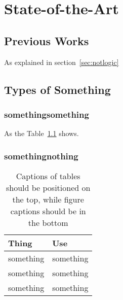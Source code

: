 \chapter{State-of-the-Art}
\label{ch:stateart}




\section{Previous Works}
\label{sec:prevworks}
	
As explained in section~\ref{sec:notlogic}
	
	
\section{Types of Something}
\label{sec:typesome}

		
\subsection{somethingsomething}
\label{subsec:somesome}
		
As the Table~\ref{tb:typesomething} shows.
		
\subsection{somethingnothing}
\label{subsec:somenoth}
		
\begin{table}[]
	\centering
	\label{tb:typesomething} %
	\caption{Captions of tables should be positioned on the top, while figure captions should be in the bottom}
	\begin{tabular}{ll}
		\hline
		\textbf{Thing} & \textbf{Use} \\
		\hline
		something & something \\
		something & something \\
		something & something \\
		\hline
	\end{tabular}
	\end{table}
		
